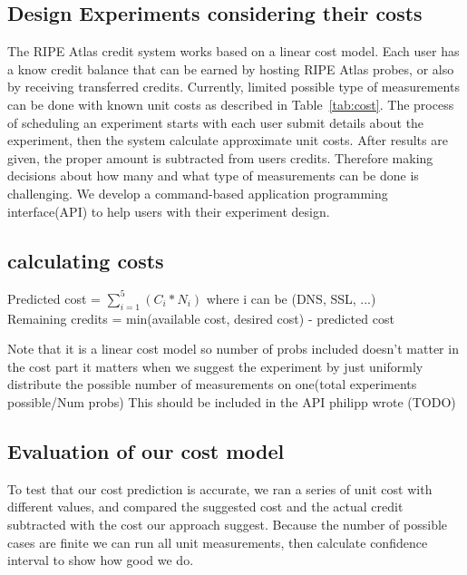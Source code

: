 \subsection{Design Experiments considering their costs}

The RIPE Atlas credit system works based on a linear cost model. Each user has a know credit balance that can be earned by hosting RIPE Atlas probes, or also by receiving transferred credits. Currently, limited possible type of measurements can be done with known unit costs as described in Table~\ref{tab:cost}. The process of scheduling an experiment starts with each user submit details about the experiment, then the system calculate approximate unit costs. After results are given, the proper amount is subtracted from users credits. Therefore making decisions about how many and what type of measurements can be done is challenging. We develop a command-based application programming interface(API) to help users with their experiment design. 

\subsection{calculating costs}

Predicted cost = $\sum_{i=1}^{5} (C_i * N_i)$  where i can be (DNS, SSL, ...)\\
Remaining credits = min(available cost, desired cost) - predicted cost

Note that it is a linear cost model so number of probs included doesn't matter in the cost part it matters when we suggest the experiment by just uniformly distribute the possible number of measurements on one(total experiments possible/Num probs)
This should be included in the API philipp wrote (TODO)

\subsection{Evaluation of our cost model}
To test that our cost prediction is accurate, we ran a series of unit cost with different values, and compared  the suggested cost and the actual credit subtracted with the cost our approach suggest. Because the number of possible cases are finite we can run all unit measurements, then calculate confidence interval to show how good we do.

